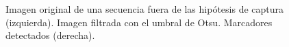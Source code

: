\begin{figure}[ht!]
{        \label{abeldetect}}
      \caption{%
       Imagen original de una secuencia fuera de las hipótesis de captura (izquierda). 
       Imagen filtrada con el umbral de Otsu. 
        Marcadores detectados (derecha).}  
      \label{ejemploabelumbr2}
\end{figure}
